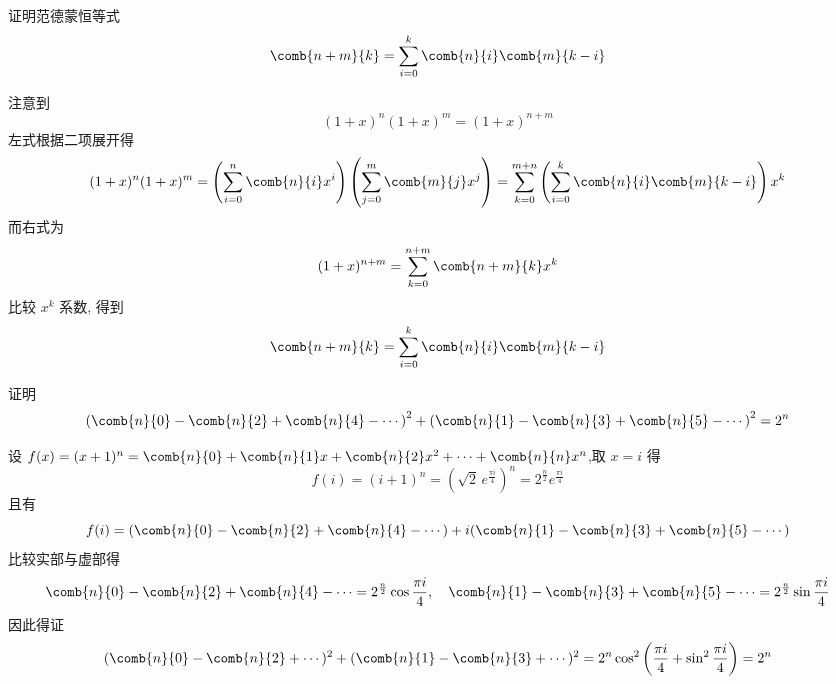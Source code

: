 \begin{questions}

    \question 证明范德蒙恒等式
    \[
    \comb{n+m}{k} = \sum_{i=0}^{k} \comb{n}{i}\comb{m}{k-i}
    \]
    \begin{solution}
        注意到
        \[
        (1+x)^n (1+x)^m = (1+x)^{n+m}
        \]
        左式根据二项展开得
        \[
        (1+x)^n (1+x)^m = \left(\sum_{i=0}^{n} \comb{n}{i}x^i\right)\left(\sum_{j=0}^{m} \comb{m}{j}x^j\right) = \sum_{k=0}^{m+n} \left(\sum_{i=0}^{k} \comb{n}{i}\comb{m}{k-i}\right)x^k
        \]
        而右式为
        \[
        (1+x)^{n+m} = \sum_{k=0}^{n+m} \comb{n+m}{k} x^k
        \]
        比较 $x^k$ 系数, 得到
        \[
        \comb{n+m}{k} = \sum_{i=0}^{k} \comb{n}{i}\comb{m}{k-i}
        \]
    \end{solution}

    \question 证明  
    \[
    \left(\comb{n}{0}-\comb{n}{2}+\comb{n}{4}-\cdots\right)^{2}+\left(\comb{n}{1}-\comb{n}{3}+\comb{n}{5}-\cdots\right)^{2}=2^{n}
    \]
    \begin{solution}
        设 \(f(x)=(x+1)^n = \comb{n}{0} + \comb{n}{1} x + \comb{n}{2} x^2 + \cdots + \comb{n}{n} x^n\),取 \(x=i\) 得 
        \[
        f(i) = (i+1)^n = (\sqrt{2}\, e^{\frac{\pi i}{4}})^n = 2^{\frac{n}{2}} e^{\frac{\pi i}{4}}
        \]
        且有
        \[
        f(i) = (\comb{n}{0} - \comb{n}{2} + \comb{n}{4} - \cdots) + i (\comb{n}{1} - \comb{n}{3} + \comb{n}{5} - \cdots)
        \]
        比较实部与虚部得 
        \[
        \comb{n}{0} - \comb{n}{2} + \comb{n}{4} - \cdots = 2^{\frac{n}{2}} \cos\frac{\pi i}{4},\quad \comb{n}{1} - \comb{n}{3} + \comb{n}{5} - \cdots = 2^{\frac{n}{2}} \sin\frac{\pi i}{4}
        \]
        因此得证
        \[
        (\comb{n}{0} - \comb{n}{2} + \cdots)^2 + (\comb{n}{1} - \comb{n}{3} + \cdots)^2 
        = 2^n\cos^2\left(\frac{\pi i}{4}+\sin^2\frac{\pi i}{4}\right) = 2^n
        \]
    \end{solution}


\end{questions}
